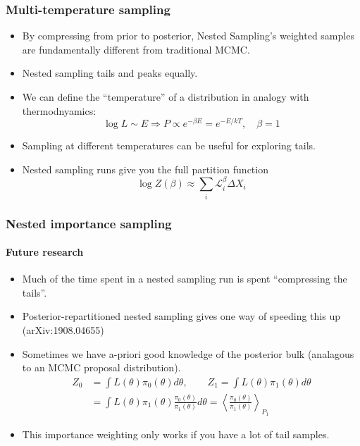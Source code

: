 \documentclass[%
]{beamer}
\newcommand{\lik}{\mathcal{L}}
\begin{document}
\begin{frame}
    \frametitle{Multi-temperature sampling}
    \begin{itemize}
        \item By compressing from prior to posterior, Nested Sampling's weighted samples are fundamentally different from traditional MCMC.
        \item Nested sampling tails and peaks equally.
        \item We can define the ``temperature'' of a distribution in analogy with thermodnyamics:
            \begin{equation}
                \log L \sim E \Rightarrow P \propto e^{-\beta E} = e^{-E/kT},\quad \beta = 1\nonumber
            \end{equation}
        \item Sampling at different temperatures can be useful for exploring tails.
        \item Nested sampling runs give you the full partition function 
            \begin{equation}
                \log Z(\beta) \approx \sum_i \lik_i^{\beta} \Delta X_{i} \nonumber
            \end{equation}
    \end{itemize}
\end{frame}

\begin{frame}
    \frametitle{Nested importance sampling}
    \framesubtitle{Future research}
    \begin{itemize}
        \item Much of the time spent in a nested sampling run is spent ``compressing the tails''.
        \item Posterior-repartitioned nested sampling gives one way of speeding this up (arXiv:1908.04655)
        \item Sometimes we have a-priori good knowledge of the posterior bulk (analagous to an MCMC proposal distribution).
        \begin{align}
            Z_0 &= \int L(\theta) \pi_0(\theta) d\theta, \qquad
            Z_1 = \int L(\theta) \pi_1(\theta) d\theta \nonumber\\
            &= \int L(\theta)\pi_1(\theta) \frac{\pi_0(\theta)}{\pi_1(\theta)} d\theta
            = \left\langle \frac{\pi_0(\theta)}{\pi_1(\theta)} \right\rangle_{P_1}  \nonumber
        \end{align}
        \item This importance weighting only works if you have a lot of tail samples.
    \end{itemize}
\end{frame}
\end{document}
